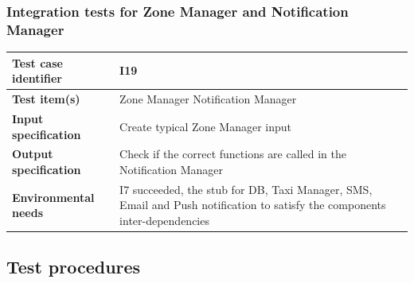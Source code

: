 \documentclass[a4paper,11pt]{report} %
\begin{document}
		\subsubsection{Integration tests for Zone Manager and Notification Manager} \label{sec:3.1.16}
			\begin{minipage}{\linewidth}
			\end{minipage}		
		\begin{center}
			\renewcommand{\arraystretch}{1.2}
			\setlength{\tabcolsep}{24pt}
			\begin{tabular}{ l  p{9cm}}\hline
				\textbf{Test case identifier} & I19\\\hline
				\textbf{Test item(s)} & Zone Manager \textrightarrow Notification Manager\\\hline
				\textbf{Input specification} & Create typical Zone Manager input \\\hline
				\textbf{Output specification} & Check if the correct functions are called in the Notification Manager\\\hline
				\textbf{Environmental needs} &  I7 succeeded, the stub for DB, Taxi Manager, SMS, Email and Push notification to satisfy the components inter-dependencies\\\hline
			\end{tabular}
		\end{center}	
		
		\bigskip
		\subsection{Test procedures}		
\end{document}
